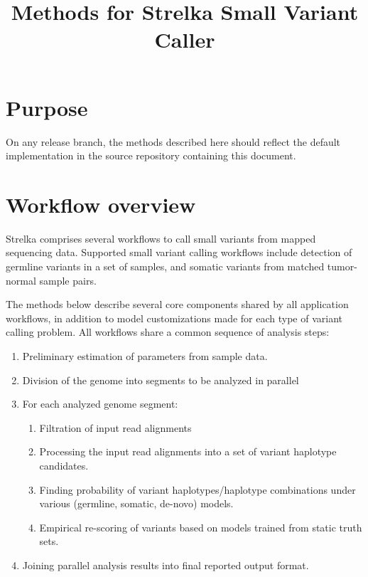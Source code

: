 \documentclass{article}
\title{Methods for Strelka Small Variant Caller}
\begin{document}
\maketitle

\tableofcontents

\section{Purpose}

On any release branch, the methods described here should reflect the default implementation in the source repository containing this document.


\section{Workflow overview}

Strelka comprises several workflows to call small variants from mapped sequencing data. Supported small variant calling workflows include detection of germline variants in a set of samples, and somatic variants from matched tumor-normal sample pairs.

The methods below describe several core components shared by all application workflows, in addition to model customizations made for each type of variant calling problem. All workflows share a common sequence of analysis steps:

\begin{enumerate}
\item Preliminary estimation of parameters from sample data.
\item Division of the genome into segments to be analyzed in parallel
\item For each analyzed genome segment:
\begin{enumerate}
\item Filtration of input read alignments
\item Processing the input read alignments into a set of variant haplotype candidates.
\item Finding probability of variant haplotypes/haplotype combinations under various (germline, somatic, de-novo) models.
\item Empirical re-scoring of variants based on models trained from static truth sets.
\end{enumerate}
\item Joining parallel analysis results into final reported output format.
\end{enumerate}
\end{document}
